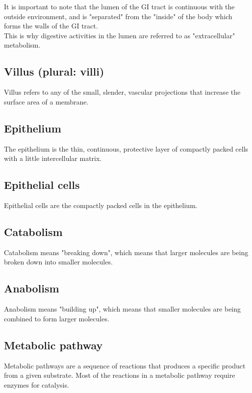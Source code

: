 \documentclass[11pt]{article}
\begin{document}
It is important to note that the lumen of the GI tract is continuous with the outside environment, and is "separated" from the "inside" of the body which forms the walls of the GI tract.
\\[0pt]

This is why digestive activities in the lumen are referred to as "extracellular" metabolism.

\subsection{Villus (plural: villi)}
\label{sec:org52a348a}
Villus refers to any of the small, slender, vascular projections that increase the surface area of a membrane.

\subsection{Epithelium}
\label{sec:org6adfb96}
The epithelium is the thin, continuous, protective layer of compactly packed cells with a little intercellular matrix.

\subsection{Epithelial cells}
\label{sec:org6757d69}
Epithelial cells are the compactly packed cells in the epithelium.

\subsection{Catabolism}
\label{sec:org9bdc6ea}
Catabolism means "breaking down", which means that larger molecules are being broken down into smaller molecules.

\subsection{Anabolism}
\label{sec:orgc44f4cf}
Anabolism means "building up", which means that smaller molecules are being combined to form larger molecules.

\newpage

\subsection{Metabolic pathway}
\label{sec:org09bd264}
Metabolic pathways are a sequence of reactions that produces a specific product from a given substrate. Most of the reactions in a metabolic pathway require enzymes for catalysis.
\end{document}
